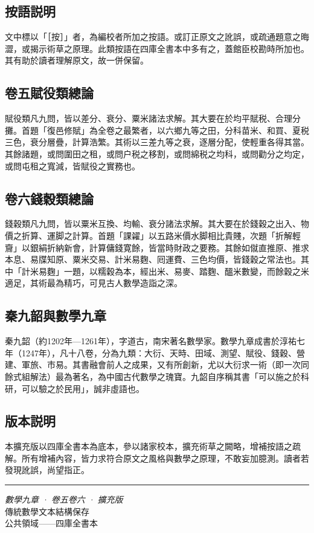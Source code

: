 \documentclass[11pt,a4paper]{article}
\begin{document}
\subsection*{按語説明}

文中標以「［按］」者，為編校者所加之按語。或訂正原文之訛誤，或疏通題意之晦澀，或揭示術草之原理。此類按語在四庫全書本中多有之，蓋館臣校勘時所加也。其有助於讀者理解原文，故一併保留。

\subsection*{卷五賦役類總論}

賦役類凡九問，皆以差分、衰分、粟米諸法求解。其大要在於均平賦税、合理分攤。首題「復邑修賦」為全卷之最繁者，以六鄉九等之田，分科苗米、和買、夏税三色，衰分層疊，計算浩繁。其術以三差九等之衰，逐層分配，使輕重各得其當。其餘諸題，或問圍田之租，或問户税之移割，或問綿税之均科，或問勸分之均定，或問屯租之寬減，皆賦役之實務也。

\subsection*{卷六錢穀類總論}

錢穀類凡九問，皆以粟米互換、均輸、衰分諸法求解。其大要在於錢穀之出入、物價之折算、運脚之計算。首題「課糴」以五路米價水脚相比貴賤，次題「折解輕齎」以銀絹折納新會，計算傭錢寛餘，皆當時財政之要務。其餘如僦直推原、推求本息、易牒知原、粟米交易、計米易麴、囘運費、三色均價，皆錢穀之常法也。其中「計米易麴」一題，以糯穀為本，經出米、易麥、踏麴、醞米數變，而餘穀之米適足，其術最為精巧，可見古人數學造詣之深。

\subsection*{秦九韶與數學九章}

秦九韶（約1202年—1261年），字道古，南宋著名數學家。數學九章成書於淳祐七年（1247年），凡十八卷，分為九類：大衍、天時、田域、測望、賦役、錢穀、營建、軍旅、市易。其書融會前人之成果，又有所創新，尤以大衍求一術（即一次同餘式組解法）最為著名，為中國古代數學之瑰寶。九韶自序稱其書「可以施之於科研，可以驗之於民用」，誠非虛語也。

\subsection*{版本説明}

本擴充版以四庫全書本為底本，參以諸家校本，擴充術草之闕略，增補按語之疏解。所有增補內容，皆力求符合原文之風格與數學之原理，不敢妄加臆測。讀者若發現訛誤，尚望指正。

\vspace{2cm}
\begin{center}
\textcolor{rulecolor}{\rule{0.5\textwidth}{0.4pt}}

\vspace{1em}
{\small\color{sectioncolor}
\textit{數學九章 · 卷五卷六 · 擴充版}\\
傳統數學文本結構保存\\
公共領域——四庫全書本}
\end{center}
\end{document}
